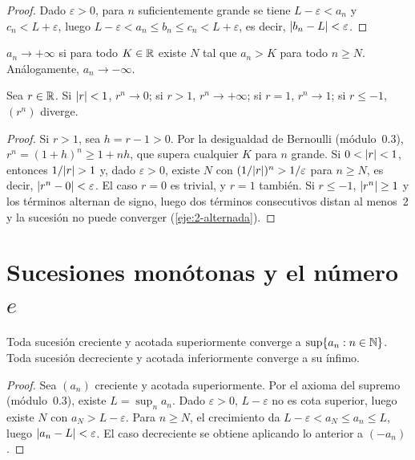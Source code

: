\begin{proof}
Dado $\varepsilon>0$, para $n$ suficientemente grande se tiene $L-\varepsilon<a_n$ y $c_n<L+\varepsilon$, luego $L-\varepsilon<a_n\le b_n\le c_n<L+\varepsilon$, es decir, $\lvert b_n-L\rvert<\varepsilon$.
\end{proof}

\begin{definicion}\label{def:div-infinito}
$a_n\to+\infty$ si para todo $K\in\mathbb{R}$ existe $N$ tal que $a_n>K$ para todo $n\ge N$. Análogamente, $a_n\to-\infty$.
\end{definicion}

\begin{proposicion}\label{prop:geometrica}
Sea $r\in\mathbb{R}$. Si $\lvert r\rvert<1$, $r^{n}\to0$; si $r>1$, $r^{n}\to+\infty$; si $r=1$, $r^{n}\to1$; si $r\le-1$, $(r^{n})$ diverge.
\end{proposicion}

\begin{proof}
Si $r>1$, sea $h=r-1>0$. Por la desigualdad de Bernoulli (módulo~0.3), $r^{n}=(1+h)^{n}\ge1+nh$, que supera cualquier $K$ para $n$ grande. Si $0<\lvert r\rvert<1$, entonces $1/\lvert r\rvert>1$ y, dado $\varepsilon>0$, existe $N$ con $(1/\lvert r\rvert)^{n}>1/\varepsilon$ para $n\ge N$, es decir, $\lvert r^{n}-0\rvert<\varepsilon$. El caso $r=0$ es trivial, y $r=1$ también. Si $r\le-1$, $\lvert r^{n}\rvert\ge1$ y los términos alternan de signo, luego dos términos consecutivos distan al menos~2 y la sucesión no puede converger (\cref{eje:2-alternada}).
\end{proof}

\section{Sucesiones monótonas y el número \texorpdfstring{$e$}{e}}

\begin{teorema}\label{teo:monotona}
Toda sucesión creciente y acotada superiormente converge a $\sup\{a_n:n\in\mathbb{N}\}$. Toda sucesión decreciente y acotada inferiormente converge a su ínfimo.
\end{teorema}

\begin{proof}
Sea $(a_n)$ creciente y acotada superiormente. Por el axioma del supremo (módulo~0.3), existe $L=\sup_n a_n$. Dado $\varepsilon>0$, $L-\varepsilon$ no es cota superior, luego existe $N$ con $a_N>L-\varepsilon$. Para $n\ge N$, el crecimiento da $L-\varepsilon<a_N\le a_n\le L$, luego $\lvert a_n-L\rvert<\varepsilon$. El caso decreciente se obtiene aplicando lo anterior a $(-a_n)$.
\end{proof}

